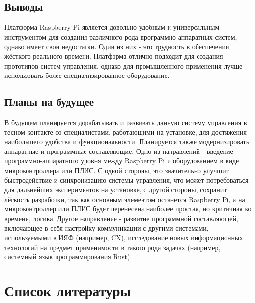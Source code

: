 \documentclass[14pt,russian,a4paper]{extarticle}
\begin{document}
\subsection{Выводы}
Платформа Raspberry Pi является довольно удобным и универсальным инструментом для создания различного рода программно-аппаратных систем, однако имеет свои недостатки. Один из них - это трудность в обеспечении жёсткого реального времени. Платформа отлично подходит для создания прототипов систем управления, однако для промышленного применения лучше использовать более специализированное оборудование.

\subsection{Планы на будущее}
В будущем планируется дорабатывать и развивать данную систему управления в тесном контакте со специалистами, работающими на установке, для достижения наибольшего удобства и функциональности. Планируется также модернизировать аппаратные и программные составляющие. Одно из направлений - введение программно-аппаратного уровня между Raspberry Pi и оборудованием в виде микроконтроллера или ПЛИС. С одной стороны, это значительно улучшит быстродействие и синхронизацию системы управления, что может потребоваться для дальнейших экспериментов на установке, с другой стороны, сохранит лёгкость разработки, так как основным элементом останется Raspberry Pi, а на микроконтроллер или ПЛИС будет перенесена наиболее простая, но критичная ко времени, логика. Другое направление - развитие программной составляющей, включающее в себя настройку коммуникации с другими системами, используемыми в ИЯФ (например, CX\cite{cx}), исследование новых информационных технологий на предмет применимости в такого рода задачах (например, системный язык программирования Rust).

\newpage

\section{Список литературы}
\end{document}
